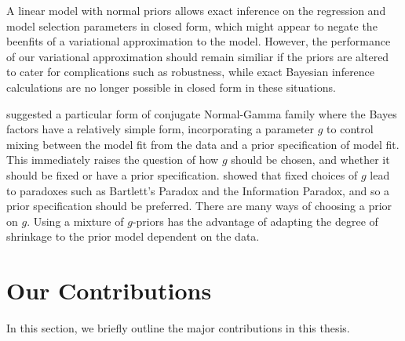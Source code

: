 A linear model with normal priors allows exact inference on the regression and model selection parameters in
closed form, which might appear to negate the beenfits of a variational approximation to the model. However,
the performance of our variational approximation should remain similiar if the priors are altered to cater for
complications such as robustness, while exact Bayesian inference calculations are no longer possible in closed
form in these situations.

\cite{Zellner1986} suggested a particular form of conjugate Normal-Gamma family where the Bayes factors have a
relatively simple form, incorporating a parameter $g$ to control mixing between the model fit from the data
and a prior specification of model fit. This immediately raises the question of how $g$ should be chosen, and
whether it should be fixed or have a prior specification. \cite{Liang2008} showed that fixed choices of $g$
lead to paradoxes such as Bartlett's Paradox and the Information Paradox, and so a prior specification should
be preferred. There are many ways of choosing a prior on $g$. Using a mixture of $g$-priors has the advantage
of adapting the degree of shrinkage to the prior model dependent on the data.

\section{Our Contributions}

In this section, we briefly outline the major contributions in this thesis.


